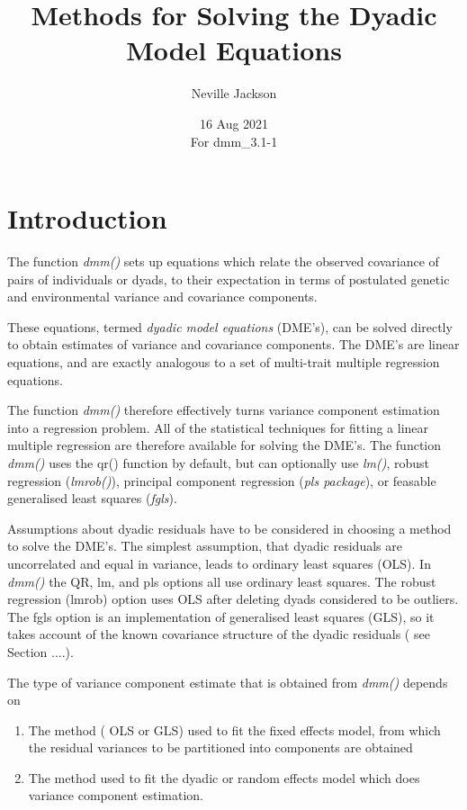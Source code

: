 \documentclass[titlepage]{article}  %
\title{ Methods for Solving the Dyadic Model Equations}
\author{Neville Jackson }
\date{16 Aug 2021 \\
      For dmm\_3.1-1}   %
\begin{document}
 
 
\maketitle      
\tableofcontents

\section{Introduction} 
The function {\em dmm()} sets up equations which relate the observed covariance of pairs of individuals or dyads, to their expectation in terms of postulated genetic and environmental variance and covariance components.

These equations, termed {\em dyadic model equations} (DME's), can be solved directly to obtain estimates of variance and covariance components.  The DME's are linear equations, and are exactly analogous to a set of multi-trait multiple regression equations. 
 
The function {\em dmm()} therefore effectively turns variance component estimation into a regression problem. All of the statistical techniques for fitting a linear multiple regression are therefore available for solving the DME's. The function {\em dmm()} uses the qr() function by default, but can optionally use {\em lm()}, robust regression ({\em lmrob()}),  principal component regression ({\em pls package}), or feasable generalised least squares ({\em fgls}).

Assumptions about dyadic residuals have to be considered in choosing a method to solve the DME's. The simplest assumption, that dyadic residuals are uncorrelated and equal in variance, leads to ordinary least squares (OLS). In {\em dmm()} the QR, lm, and pls options all use ordinary least squares. The robust regression (lmrob) option uses OLS after deleting dyads considered to be outliers.  The fgls option is an implementation of generalised least squares (GLS), so it takes account of the known covariance structure of the dyadic residuals ( see Section ....). 

The type of variance component estimate that is obtained from {\em dmm()} depends on 
\begin{enumerate}
\item The method ( OLS or GLS) used to fit the fixed effects model, from which the residual variances to be partitioned into components are obtained
\item The method used to fit the dyadic or random effects model which does variance component estimation.
\end{enumerate}
\end{document}
